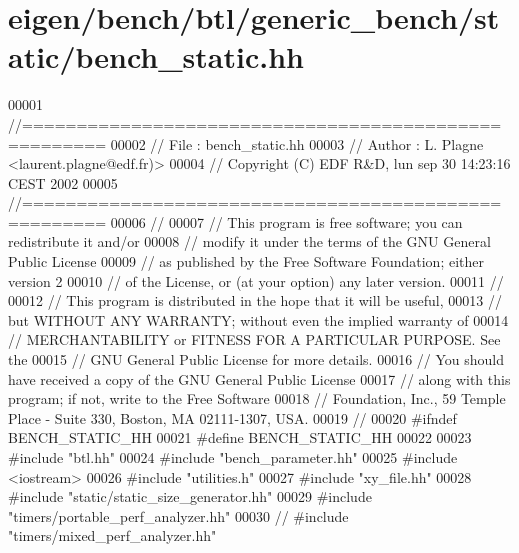 \hypertarget{eigen_2bench_2btl_2generic__bench_2static_2bench__static_8hh_source}{}\section{eigen/bench/btl/generic\+\_\+bench/static/bench\+\_\+static.hh}
\label{eigen_2bench_2btl_2generic__bench_2static_2bench__static_8hh_source}

\begin{DoxyCode}
00001 \textcolor{comment}{//=====================================================}
00002 \textcolor{comment}{// File   :  bench\_static.hh}
00003 \textcolor{comment}{// Author :  L. Plagne <laurent.plagne@edf.fr)>}
00004 \textcolor{comment}{// Copyright (C) EDF R&D,  lun sep 30 14:23:16 CEST 2002}
00005 \textcolor{comment}{//=====================================================}
00006 \textcolor{comment}{//}
00007 \textcolor{comment}{// This program is free software; you can redistribute it and/or}
00008 \textcolor{comment}{// modify it under the terms of the GNU General Public License}
00009 \textcolor{comment}{// as published by the Free Software Foundation; either version 2}
00010 \textcolor{comment}{// of the License, or (at your option) any later version.}
00011 \textcolor{comment}{//}
00012 \textcolor{comment}{// This program is distributed in the hope that it will be useful,}
00013 \textcolor{comment}{// but WITHOUT ANY WARRANTY; without even the implied warranty of}
00014 \textcolor{comment}{// MERCHANTABILITY or FITNESS FOR A PARTICULAR PURPOSE.  See the}
00015 \textcolor{comment}{// GNU General Public License for more details.}
00016 \textcolor{comment}{// You should have received a copy of the GNU General Public License}
00017 \textcolor{comment}{// along with this program; if not, write to the Free Software}
00018 \textcolor{comment}{// Foundation, Inc., 59 Temple Place - Suite 330, Boston, MA  02111-1307, USA.}
00019 \textcolor{comment}{//}
00020 \textcolor{preprocessor}{#ifndef BENCH\_STATIC\_HH}
00021 \textcolor{preprocessor}{#define BENCH\_STATIC\_HH}
00022 
00023 \textcolor{preprocessor}{#include "btl.hh"}
00024 \textcolor{preprocessor}{#include "bench\_parameter.hh"}
00025 \textcolor{preprocessor}{#include <iostream>}
00026 \textcolor{preprocessor}{#include "utilities.h"}
00027 \textcolor{preprocessor}{#include "xy\_file.hh"}
00028 \textcolor{preprocessor}{#include "static/static\_size\_generator.hh"}
00029 \textcolor{preprocessor}{#include "timers/portable\_perf\_analyzer.hh"}
00030 \textcolor{comment}{// #include "timers/mixed\_perf\_analyzer.hh"}

\end{DoxyCode}
